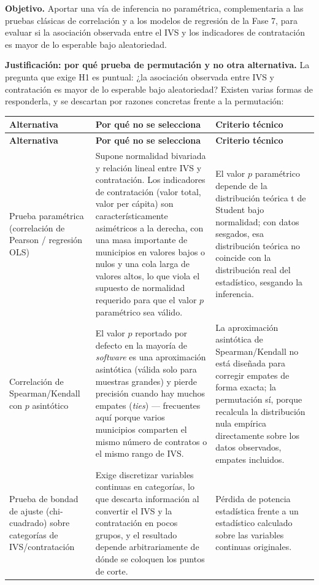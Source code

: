 \documentclass[11pt,letterpaper]{article}
\begin{document}
\textbf{Objetivo.} Aportar una vía de inferencia no paramétrica,
complementaria a las pruebas clásicas de correlación y a los modelos de
regresión de la Fase 7, para evaluar si la asociación observada entre el IVS y
los indicadores de contratación es mayor de lo esperable bajo aleatoriedad.

\textbf{Justificación: por qué prueba de permutación y no otra alternativa.}
La pregunta que exige H1 es puntual: ¿la asociación observada entre IVS y
contratación es mayor de lo esperable bajo aleatoriedad? Existen varias formas
de responderla, y se descartan por razones concretas frente a la permutación:

\begin{center}
\small
\begin{longtable}{p{2.8cm}p{5.9cm}p{4.8cm}}
\toprule
\textbf{Alternativa} & \textbf{Por qué no se selecciona} & \textbf{Criterio técnico} \\
\midrule
\endfirsthead
\toprule
\textbf{Alternativa} & \textbf{Por qué no se selecciona} & \textbf{Criterio técnico} \\
\midrule
\endhead
Prueba paramétrica (correlación de Pearson / regresión OLS) & Supone normalidad bivariada y relación lineal entre IVS y contratación. Los indicadores de contratación (valor total, valor per cápita) son característicamente asimétricos a la derecha, con una masa importante de municipios en valores bajos o nulos y una cola larga de valores altos, lo que viola el supuesto de normalidad requerido para que el valor $p$ paramétrico sea válido. & El valor $p$ paramétrico depende de la distribución teórica t de Student bajo normalidad; con datos sesgados, esa distribución teórica no coincide con la distribución real del estadístico, sesgando la inferencia. \\
Correlación de Spearman/Kendall con $p$ asintótico & El valor $p$ reportado por defecto en la mayoría de \textit{software} es una aproximación asintótica (válida solo para muestras grandes) y pierde precisión cuando hay muchos empates (\textit{ties}) --- frecuentes aquí porque varios municipios comparten el mismo número de contratos o el mismo rango de IVS. & La aproximación asintótica de Spearman/Kendall no está diseñada para corregir empates de forma exacta; la permutación sí, porque recalcula la distribución nula empírica directamente sobre los datos observados, empates incluidos. \\
Prueba de bondad de ajuste (chi-cuadrado) sobre categorías de IVS/contratación & Exige discretizar variables continuas en categorías, lo que descarta información al convertir el IVS y la contratación en pocos grupos, y el resultado depende arbitrariamente de dónde se coloquen los puntos de corte. & Pérdida de potencia estadística frente a un estadístico calculado sobre las variables continuas originales. \\

\end{longtable}
\end{center}
\end{document}
